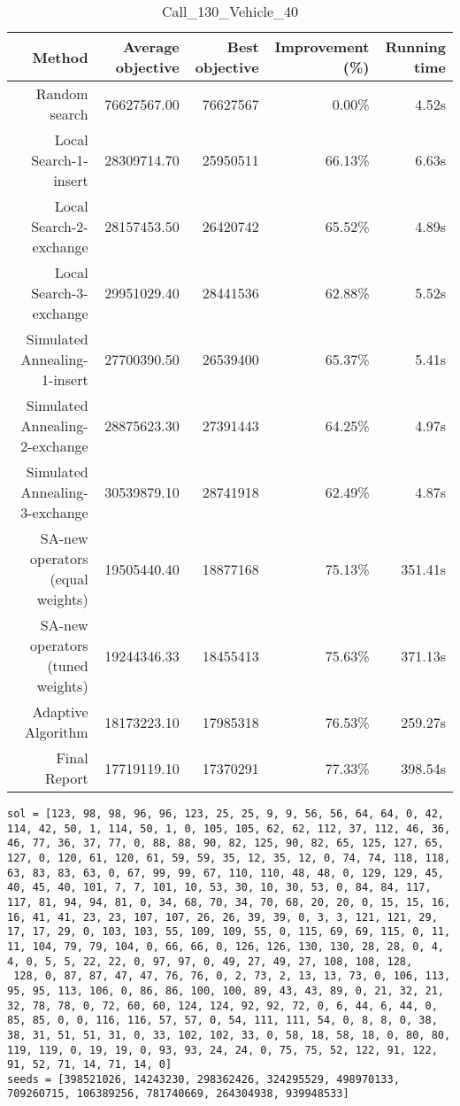 \begin{table}[ht]
\centering
\caption{Call\_130\_Vehicle\_40}
\label{tab:call130vehicle40}
\begin{tabular}{|r|r|r|r|r|}
Method & Average objective & Best objective & Improvement (\%) & Running time \\
\hline
Random search & 76627567.00 & 76627567 & 0.00\% & 4.52s\\
Local Search-1-insert & 28309714.70 & 25950511 & 66.13\% & 6.63s\\
Local Search-2-exchange & 28157453.50 & 26420742 & 65.52\% & 4.89s\\
Local Search-3-exchange & 29951029.40 & 28441536 & 62.88\% & 5.52s\\
Simulated Annealing-1-insert & 27700390.50 & 26539400 & 65.37\% & 5.41s\\
Simulated Annealing-2-exchange & 28875623.30 & 27391443 & 64.25\% & 4.97s\\
Simulated Annealing-3-exchange & 30539879.10 & 28741918 & 62.49\% & 4.87s\\
SA-new operators (equal weights) & 19505440.40 & 18877168 & 75.13\% & 351.41s\\
SA-new operators (tuned weights) & 19244346.33 & 18455413 & 75.63\% & 371.13s\\
Adaptive Algorithm & 18173223.10 & 17985318 & 76.53\% & 259.27s\\
Final Report & 17719119.10 & 17370291 & 77.33\% & 398.54s\\
\end{tabular}%
\end{table}
\begin{lstlisting}[label={lst:call130vehicle40},caption=Optimal solution call\_130\_vehicle\_40]
sol = [123, 98, 98, 96, 96, 123, 25, 25, 9, 9, 56, 56, 64, 64, 0, 42, 114, 42, 50, 1, 114, 50, 1, 0, 105, 105, 62, 62, 112, 37, 112, 46, 36, 46, 77, 36, 37, 77, 0, 88, 88, 90, 82, 125, 90, 82, 65, 125, 127, 65, 127, 0, 120, 61, 120, 61, 59, 59, 35, 12, 35, 12, 0, 74, 74, 118, 118, 63, 83, 83, 63, 0, 67, 99, 99, 67, 110, 110, 48, 48, 0, 129, 129, 45, 40, 45, 40, 101, 7, 7, 101, 10, 53, 30, 10, 30, 53, 0, 84, 84, 117, 117, 81, 94, 94, 81, 0, 34, 68, 70, 34, 70, 68, 20, 20, 0, 15, 15, 16, 16, 41, 41, 23, 23, 107, 107, 26, 26, 39, 39, 0, 3, 3, 121, 121, 29, 17, 17, 29, 0, 103, 103, 55, 109, 109, 55, 0, 115, 69, 69, 115, 0, 11, 11, 104, 79, 79, 104, 0, 66, 66, 0, 126, 126, 130, 130, 28, 28, 0, 4, 4, 0, 5, 5, 22, 22, 0, 97, 97, 0, 49, 27, 49, 27, 108, 108, 128,
 128, 0, 87, 87, 47, 47, 76, 76, 0, 2, 73, 2, 13, 13, 73, 0, 106, 113, 95, 95, 113, 106, 0, 86, 86, 100, 100, 89, 43, 43, 89, 0, 21, 32, 21, 32, 78, 78, 0, 72, 60, 60, 124, 124, 92, 92, 72, 0, 6, 44, 6, 44, 0, 85, 85, 0, 0, 116, 116, 57, 57, 0, 54, 111, 111, 54, 0, 8, 8, 0, 38, 38, 31, 51, 51, 31, 0, 33, 102, 102, 33, 0, 58, 18, 58, 18, 0, 80, 80, 119, 119, 0, 19, 19, 0, 93, 93, 24, 24, 0, 75, 75, 52, 122, 91, 122, 91, 52, 71, 14, 71, 14, 0]
seeds = [398521026, 14243230, 298362426, 324295529, 498970133, 709260715, 106389256, 781740669, 264304938, 939948533]
\end{lstlisting}%
\clearpage


